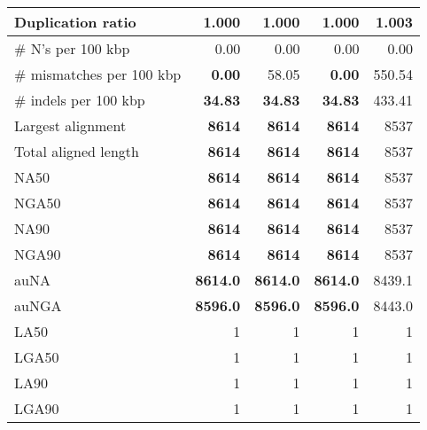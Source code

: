 \documentclass[12pt,a4paper]{article}
\begin{document}
\begin{table}[ht]
\begin{center}
\begin{tabular}{|l*{4}{|r}|}
Duplication ratio & {\bf 1.000} & {\bf 1.000} & {\bf 1.000} & 1.003 \\ \hline
\# N's per 100 kbp & 0.00 & 0.00 & 0.00 & 0.00 \\ \hline
\# mismatches per 100 kbp & {\bf 0.00} & 58.05 & {\bf 0.00} & 550.54 \\ \hline
\# indels per 100 kbp & {\bf 34.83} & {\bf 34.83} & {\bf 34.83} & 433.41 \\ \hline
Largest alignment & {\bf 8614} & {\bf 8614} & {\bf 8614} & 8537 \\ \hline
Total aligned length & {\bf 8614} & {\bf 8614} & {\bf 8614} & 8537 \\ \hline
NA50 & {\bf 8614} & {\bf 8614} & {\bf 8614} & 8537 \\ \hline
NGA50 & {\bf 8614} & {\bf 8614} & {\bf 8614} & 8537 \\ \hline
NA90 & {\bf 8614} & {\bf 8614} & {\bf 8614} & 8537 \\ \hline
NGA90 & {\bf 8614} & {\bf 8614} & {\bf 8614} & 8537 \\ \hline
auNA & {\bf 8614.0} & {\bf 8614.0} & {\bf 8614.0} & 8439.1 \\ \hline
auNGA & {\bf 8596.0} & {\bf 8596.0} & {\bf 8596.0} & 8443.0 \\ \hline
LA50 & 1 & 1 & 1 & 1 \\ \hline
LGA50 & 1 & 1 & 1 & 1 \\ \hline
LA90 & 1 & 1 & 1 & 1 \\ \hline
LGA90 & 1 & 1 & 1 & 1 \\ \hline
\end{tabular}
\end{center}
\end{table}
\end{document}
